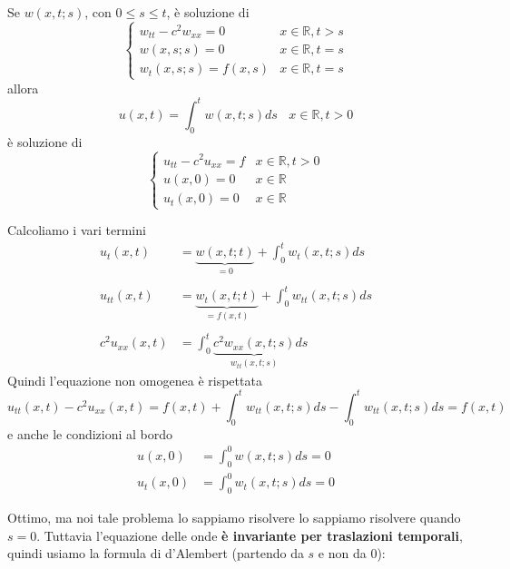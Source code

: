 \documentclass[10pt,a4paper,twoside,openright]{book}
\begin{document}
\begin{theorem}
 Se $\displaystyle w( x,t;s)$, con $\displaystyle 0\leqslant s\leqslant t$, è soluzione di
\begin{equation*}
\begin{cases}
w_{tt} -c^{2} w_{xx} =\boxed{0} & x\in \mathbb{R} ,\boxed{t >s}\\
w( x,s;s) =0 & x\in \mathbb{R} ,t=s\\
w_{t}( x,s;s) =f( x,s) & x\in \mathbb{R} ,t=s
\end{cases}
\end{equation*}
allora
\begin{equation*}
u( x,t) =\int _{0}^{t} w( x,t;s) ds\ \ \ \ x\in \mathbb{R} ,t >0
\end{equation*}
è soluzione di
\begin{equation*}
\begin{cases}
u_{tt} -c^{2} u_{xx} =f & x\in \mathbb{R} ,t >0\\
u( x,0) =0 & x\in \mathbb{R}\\
u_{t}( x,0) =0 & x\in \mathbb{R}
\end{cases}
\end{equation*}
\end{theorem}
\begin{dimostrazione}
Calcoliamo i vari termini
\begin{align*}
u_{t}( x,t) & =\underbrace{w( x,t;t)}_{=0} +\int _{0}^{t} w_{t}( x,t;s) ds\\
 & \\
u_{tt}( x,t) & =\underbrace{w_{t}( x,t;t)}_{=f( x,t)} +\int _{0}^{t} w_{tt}( x,t;s) ds\\
 & \\
c^{2} u_{xx}( x,t) & =\int _{0}^{t}\underbrace{c^{2} w_{xx}( x,t;s)}_{w_{tt}( x,t;s)} ds
\end{align*}
Quindi l'equazione non omogenea è rispettata
\begin{equation*}
u_{tt}( x,t) -c^{2} u_{xx}( x,t) =f( x,t) +\int _{0}^{t} w_{tt}( x,t;s) ds-\int _{0}^{t} w_{tt}( x,t;s) ds=f( x,t)
\end{equation*}
e anche le condizioni al bordo
\begin{align*}
u( x,0) & =\int _{0}^{0} w( x,t;s) ds=0\\
u_{t}( x,0) & =\int _{0}^{0} w_{t}( x,t;s) ds=0
\end{align*}
\end{dimostrazione}
Ottimo, ma noi tale problema lo sappiamo risolvere lo sappiamo risolvere quando $\displaystyle s=0$. Tuttavia l'equazione delle onde \textbf{è invariante per traslazioni temporali}, quindi usiamo la formula di d'Alembert (partendo da $\displaystyle s$ e non da $\displaystyle 0$):
\end{document}

